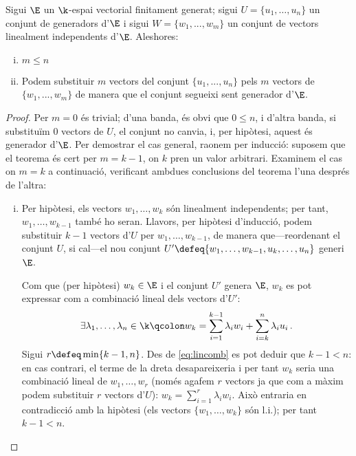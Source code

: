 \begin{specialteo}\label{teo:steinitz}
	Sigui $\E$ un $\k$-espai vectorial finitament generat; sigui $U = \{u_1,\dots, u_n\}$ un conjunt de generadors d'$\E$ i sigui $W = \{w_1,..., w_m\}$ un conjunt de vectors linealment independents d'$\E$. Aleshores:
	\begin{enumerate}[i)]
		\item $m \leq n$
		\item Podem substituir $m$ vectors del conjunt $\{u_1, ..., u_n\}$ pels $m$ vectors de $\{w_1,..., w_m\}$ de manera que el conjunt segueixi sent generador d'$\E$.
	\end{enumerate}	
	\begin{proof} 
		Per $m=0$ és trivial; d'una banda, és obvi que $0\le n$, i d'altra banda, si substituïm 0 vectors de $U$, el conjunt no canvia, i, per  hipòtesi, aquest és generador d'$\E$. Per demostrar el cas general, raonem per inducció: suposem que el teorema és cert per $m = k-1$, on $k$ pren un valor arbitrari. Examinem el cas on $m = k$ a continuació, verificant ambdues conclusions del teorema l'una després de l'altra:
		
		\begin{enumerate}[i)]
			\item Per hipòtesi, els vectors $w_1, \ldots, w_k$ són linealment independents; per tant, %
			$w_1, \ldots, w_{k-1}$ també ho seran. Llavors, per hipòtesi d'inducció, podem substituir $k-1$ vectors d'$U$ per $w_1, \ldots, w_{k-1}$, de manera que---reordenant el conjunt $U$, si cal---el nou conjunt ${U'\defeq \{w_1, \ldots, w_{k-1}, u_k, \ldots, u_n\}}$ generi $\E$.
			
			Com que (per hipòtesi) $w_k\in\E$ i el conjunt $U'$ genera $\E$, $w_k$ es pot expressar com a combinació lineal dels vectors d'$U'$: 
			\begin{equation}\label{eq:lincomb}
				\exists \lambda_1,\ldots, \lambda_n \in \k \qcolon w_k = \sum_{i=1}^{k-1} \lambda_i w_i + \sum_{i = k}^{n} \lambda_i u_i\,.
			\end{equation}
			Sigui $r \defeq \min \{k-1, n\}$. Des de \eqref{eq:lincomb} es pot deduir que $k-1 < n$: en cas contrari, el terme de la dreta desapareixeria i per tant $w_k$ seria una combinació lineal de $w_1, \ldots, w_r$ (només agafem $r$ vectors ja que com a màxim podem substituir $r$ vectors d'$U$): $w_k = \sum_{i=1}^{r} \lambda_iw_i$. Això entraria en contradicció amb la hipòtesi (els vectors $\{w_1, \ldots, w_k\}$ són l.i.); per tant $k-1 < n$.
			

\end{enumerate}
\end{proof}
\end{specialteo}
